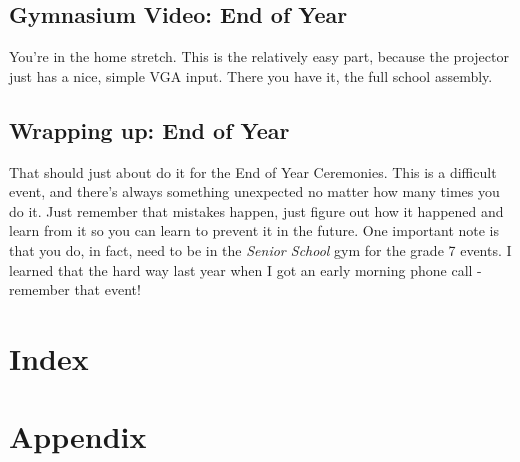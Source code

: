 \documentclass[11pt,a4paper]{book}
\begin{document}
\section{Gymnasium Video: End of Year}
You're in the home stretch. This is the relatively easy part, because the projector just has a nice, simple VGA input. There you have it, the full school assembly.
\section{Wrapping up: End of Year}
That should just about do it for the End of Year Ceremonies. This is a difficult event, and there's always something unexpected no matter how many times you do it. Just remember that mistakes happen, just figure out how it happened and learn from it so you can learn to prevent it in the future. One important note is that you do, in fact, need to be in the \textit{Senior School} gym for the grade 7 events. I learned that the hard way last year when I got an early morning phone call - remember that event!

\chapter{Index}
\printindex

\appendix
\chapter{Appendix}
\end{document}
